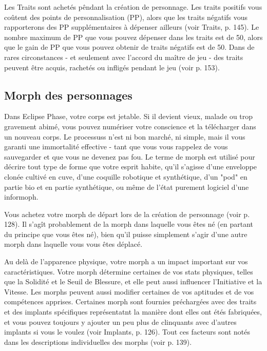 Les Traits sont achetés pêndant la création de personnage. Les traits positifs vous coûtent des points de personnalisation (PP), alors que les traits négatifs vous rapporterons des PP supplémentaires à dépenser ailleurs (voir Traits, p. 145). Le nombre maximum de PP que vous pouvez dépenser dans les traits est de 50, alors que le gain de PP que vous pouvez obtenir de traits négatifs est de 50. Dans de rares circonstances - et seulement avec l'accord du maître de jeu - des traits peuvent être acquis, rachetés ou infligés pendant le jeu (voir p. 153). 

\subsection{Morph des personnages} \label{sec:character-morph} 

Dans Eclipse Phase, votre corps est jetable. Si il devient vieux, malade ou trop gravement abimé, vous pouvez numériser votre conscience et la télécharger dans un nouveau corps. Le processuss n'est ni bon marché, ni simple, mais il vous garanti une immortalité effective - tant que vous vous rappelez de vous sauvegarder et que vous ne devenez pas fou. Le terme de morph est utilisé pour décrire tout type de forme que votre esprit habite, qu'il s'agisse d'une enveloppe clonée cultivé en cuve, d'une coquille robotique et synthétique, d'un "pod" en partie bio et en partie synthétique, ou même de l'état purement logiciel d'une informoph. 

Vous achetez votre morph de départ lors de la création de personnage (voir p. 128). Il s'agît probablement de la morph dans laquelle vous êtes né (en partant du principe que vous êtes né), bien qu'il puisse simplement s'agir d'une autre morph dans laquelle vous vous êtes déplacé. 

Au delà de l'apparence physique, votre morph a un impact important sur vos caractéristiques. Votre morph détermine certaines de vos stats physiques, telles que la Solidité et le Seuil de Blessure, et elle peut aussi influencer l'Initiative et la Vitesse. Les morphs peuvent aussi modifier certaines de vos aptitudes et de vos compétences apprises. Certaines morph sont fournies préchargées avec des traits et des implants spécifiques représentatnt la manière dont elles ont étés fabriquées, et vous pouvez toujours y ajouter un peu plus de clinquants avec d'autres implants si vous le voulez (voir Implants, p. 126). Tout ces facteurs sont notés dans les descriptions individuelles des morphs (voir p. 139). 

